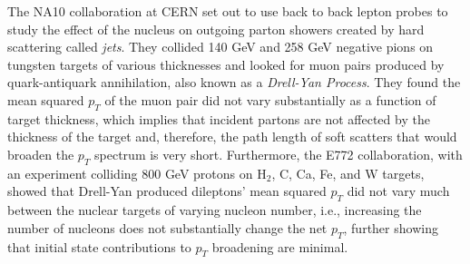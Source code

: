The NA10 collaboration at CERN set out to use back to back lepton probes to study the effect of the nucleus on outgoing parton showers created by hard scattering called \textit{jets}. They collided 140 GeV and 258 GeV negative pions on tungsten targets of various thicknesses and looked for muon pairs produced by quark-antiquark annihilation, also known as a \textit{Drell-Yan Process}.
They found the mean squared $p_{T}$ of the muon pair did not vary substantially as a function of target thickness, which implies that incident partons are not affected by the thickness of the target and, therefore, the path length of soft scatters that would broaden the $p_{T}$ spectrum is very short. Furthermore, the E772 collaboration, with an experiment colliding 800 GeV protons on H$_{2}$, C, Ca, Fe, and W targets, showed that Drell-Yan produced dileptons’ mean squared $p_{T}$ did not vary much between the nuclear targets of varying nucleon number\citep{PhysRevLett.66.2285}, i.e., increasing the number of nucleons does not substantially change the net $p_{T}$, further showing that initial state contributions to $p_{T}$ broadening are minimal.

